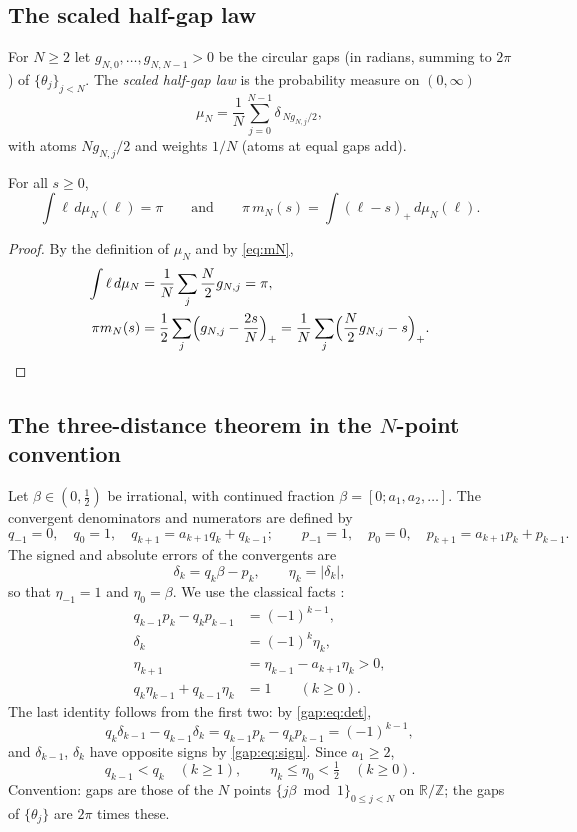 \subsection{The scaled half-gap law}\label{gap:sec:mu}

For $N\ge2$ let $g_{N,0},\dots,g_{N,N-1}>0$ be the circular gaps (in radians, summing to $2\pi$) of
$\{\theta_j\}_{j<N}$. The \emph{scaled half-gap law} is the probability measure on $(0,\infty)$
\[
\mu_N=\frac1N\sum_{j=0}^{N-1}\delta_{\,N g_{N,j}/2},
\]
with atoms $N g_{N,j}/2$ and weights $1/N$ (atoms at equal gaps add).

\begin{lemma}\label{gap:lem:mu}
For all $s\ge0$,
\[
\int\ell\,d\mu_N(\ell)=\pi
\qquad\text{and}\qquad
\pi\,m_N(s)=\int(\ell-s)_+\,d\mu_N(\ell).
\]
\end{lemma}
\begin{proof}
By the definition of $\mu_N$ and by \eqref{eq:mN},
\begin{align*}
\int\ell\,d\mu_N&=\frac1N\sum_j\frac N2g_{N,j}=\pi,\\
\pi m_N(s)&=\frac12\sum_j\Bigl(g_{N,j}-\frac{2s}N\Bigr)_+
=\frac1N\sum_j\Bigl(\frac N2g_{N,j}-s\Bigr)_+ .\qedhere
\end{align*}
\end{proof}

\subsection{The three-distance theorem in the $N$-point convention}\label{gap:sec:three}

Let $\beta\in(0,\tfrac12)$ be irrational, with continued fraction $\beta=[0;a_1,a_2,\dots]$.
The convergent denominators and numerators are defined by
\[
q_{-1}=0,\quad q_0=1,\quad q_{k+1}=a_{k+1}q_k+q_{k-1};\qquad
p_{-1}=1,\quad p_0=0,\quad p_{k+1}=a_{k+1}p_k+p_{k-1}.
\]
The signed and absolute errors of the convergents are
\[
\delta_k=q_k\beta-p_k,\qquad \eta_k=|\delta_k|,
\]
so that $\eta_{-1}=1$ and $\eta_0=\beta$. We use the classical facts \cite[Ch.~I]{Khi64}:
\begin{align}
q_{k-1}p_k-q_kp_{k-1}&=(-1)^{k-1},\label{gap:eq:det}\\
\delta_k&=(-1)^k\eta_k,\label{gap:eq:sign}\\
\eta_{k+1}&=\eta_{k-1}-a_{k+1}\eta_k>0,\label{gap:eq:rec}\\
q_k\eta_{k-1}+q_{k-1}\eta_k&=1\qquad(k\ge0).\label{gap:eq:F2}
\end{align}
The last identity follows from the first two: by \eqref{gap:eq:det},
\[
q_k\delta_{k-1}-q_{k-1}\delta_k=q_{k-1}p_k-q_kp_{k-1}=(-1)^{k-1},
\]
and $\delta_{k-1}$, $\delta_k$ have opposite signs by \eqref{gap:eq:sign}.
Since $a_1\ge2$,
\[
q_{k-1}<q_k\quad(k\ge1),\qquad \eta_k\le\eta_0<\tfrac12\quad(k\ge0).
\]
Convention: gaps are those of the $N$ points $\{j\beta\bmod1\}_{0\le j<N}$ on $\mathbb R/\mathbb Z$;
the gaps of $\{\theta_j\}$ are $2\pi$ times these.

